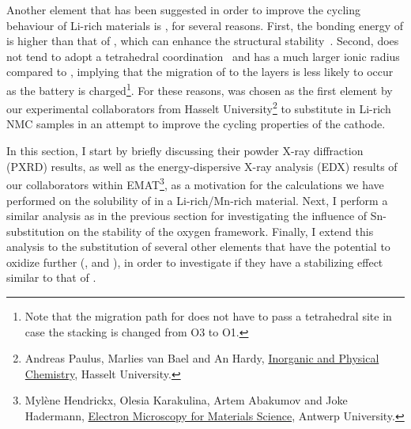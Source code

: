 \begin{refsection}
Another element that has been suggested in order to improve the cycling 
behaviour of Li-rich materials is , for several reasons. First, 
the bonding energy of  is higher than that of , which can 
enhance the structural stability~\cite{Qiao2015}. Second,  does 
not tend to adopt a tetrahedral coordination~\cite{Sathiya2013} and has a much 
larger ionic radius compared to , implying that the migration of 
 to the  layers is less likely to occur as the battery is 
charged\footnote{Note that the migration path for  does not have 
to pass a tetrahedral site in case the stacking is changed from O3 to O1.}. 
For these reasons,  was chosen as the first element by our 
experimental collaborators from Hasselt University\footnote{Andreas Paulus, 
Marlies van Bael and An Hardy, \href{https://www.uhasselt.be/UH/IMO/Visit-the-groups/Inorganic-and-physical-chemistry-(IPC).html}{Inorganic and Physical Chemistry}, Hasselt University.} to substitute in 
Li-rich \gls{NMC} samples in an attempt to improve the cycling properties of the 
cathode. 

In this section, I start by briefly discussing their powder X-ray diffraction (\gls{PXRD}) results, as well as 
the energy-dispersive X-ray analysis (\gls{EDX}) results of our collaborators within EMAT\footnote{Myl\`ene Hendrickx, Olesia 
Karakulina, Artem Abakumov and Joke Hadermann, \href{https://www.uantwerpen.be/en/research-groups/emat/}{Electron Microscopy for Materials 
Science}, Antwerp University.}, as a motivation for the 
calculations we have performed on the solubility of  in a 
Li-rich/Mn-rich material. Next, I perform a similar analysis as in the 
previous section for investigating the influence of Sn-substitution on the 
stability of the oxygen framework. Finally, I extend this analysis to the 
substitution of several other elements that have the potential to oxidize 
further (,  and ), in order to investigate if they have a 
stabilizing effect similar to that of .  

 

\end{refsection}
